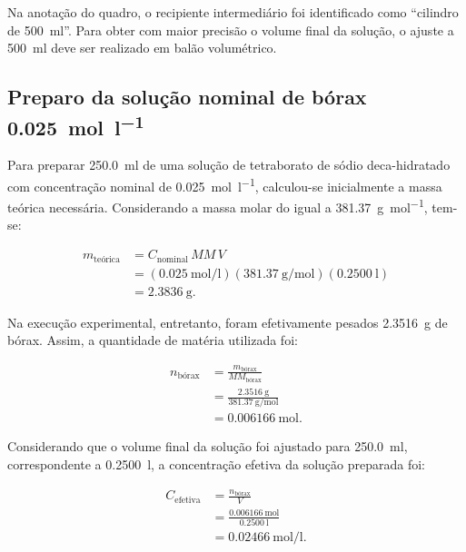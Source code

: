 \documentclass[a4paper,12pt]{article}
\begin{document}
\begin{tcolorbox}[
  title=Observação técnica,
  colback=quadrocinza,
  colframe=black!65,
  boxrule=0.6pt,
  arc=1mm
]
Na anotação do quadro, o recipiente intermediário foi identificado como ``cilindro de \qty{500}{\milli\litre}''. Para obter com maior precisão o volume final da solução, o ajuste a \qty{500}{\milli\litre} deve ser realizado em balão volumétrico.
\end{tcolorbox}

\subsection{Preparo da solução nominal de bórax \qty{0.025}{\mole\per\litre}}

Para preparar \qty{250.0}{\milli\litre} de uma solução de tetraborato de sódio deca-hidratado com concentração nominal de \qty{0.025}{\mole\per\litre}, calculou-se inicialmente a massa teórica necessária. Considerando a massa molar do  igual a \qty{381.37}{\gram\per\mole}, tem-se:

\begin{align*}
  m_{\text{teórica}}
    &= C_{\text{nominal}}\,MM\,V \\
    &= \left(\qty{0.025}{\mole\per\litre}\right)
       \left(\qty{381.37}{\gram\per\mole}\right)
       \left(\qty{0.2500}{\litre}\right) \\
    &= \boxed{\qty{2.3836}{\gram}}.
\end{align*}

Na execução experimental, entretanto, foram efetivamente pesados \qty{2.3516}{\gram} de bórax. Assim, a quantidade de matéria utilizada foi:

\begin{align*}
  n_{\text{bórax}}
    &= \frac{m_{\text{bórax}}}{MM_{\text{bórax}}} \\
    &= \frac{\qty{2.3516}{\gram}}
             {\qty{381.37}{\gram\per\mole}} \\
    &= \boxed{\qty{0.006166}{\mole}}.
\end{align*}

Considerando que o volume final da solução foi ajustado para \qty{250.0}{\milli\litre}, correspondente a \qty{0.2500}{\litre}, a concentração efetiva da solução preparada foi:

\begin{align*}
  C_{\text{efetiva}}
    &= \frac{n_{\text{bórax}}}{V} \\
    &= \frac{\qty{0.006166}{\mole}}
             {\qty{0.2500}{\litre}} \\
    &= \boxed{\qty{0.02466}{\mole\per\litre}}.
\end{align*}
\end{document}
